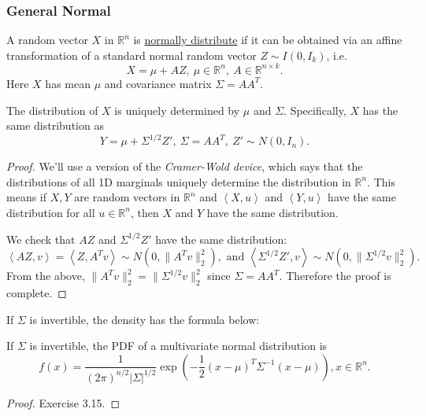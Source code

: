 \subsubsection{General Normal}
\begin{definition}[]
\label{def:3.3.4}
A random vector $X$ in $\mathbb{R}^n$ is \underline{normally distribute} if it can be obtained via an 
affine transformation of a standard normal random vector $Z \sim I(0, I_k)$, i.e.
\[ X = \mu + AZ, \ \mu \in \mathbb{R}^n, \ A \in \mathbb{R}^{n \times k}. \]
Here $X$ has mean $\mu$ and covariance matrix $\Sigma = AA^T$.
\end{definition}

\begin{proposition}
\label{prop:3.3.5}
The distribution of $X$ is uniquely determined by $\mu$ and $\Sigma$. Specifically, $X$ has the same 
distribution as 
\[ Y = \mu + \Sigma^{1/2}Z', \ \Sigma = AA^T, \ Z' \sim N(0, I_n). \]
\end{proposition}

\begin{proof}
We'll use a version of the \textit{Cramer-Wold device}, which says that the distributions of all 1D marginals 
uniquely determine the distribution in $\mathbb{R}^n$. This means if $X, Y$ are random vectors in $\mathbb{R}^n$ 
and $\left\langle X, u \right\rangle$ and $\left\langle Y, u \right\rangle$ have the same distribution for all 
$u \in \mathbb{R}^n$, then $X$ and $Y$ have the same distribution.

We check that $AZ$ and $\Sigma^{1/2} Z'$ have the same distribution: 
\[ \left\langle AZ, v \right\rangle = \left\langle Z, A^T v \right\rangle \sim N(0, 
\lVert A^T v \rVert_{2}^2), \text{ and } \left\langle \Sigma^{1/2}Z', v \right\rangle 
\sim N(0, \lVert \Sigma^{1/2} v \rVert_{2}^2). \]
From the above, $\lVert A^T v \rVert_{2}^2 = \lVert \Sigma^{1/2} v \rVert_{2}^2$ since $\Sigma = AA^T$. 
Therefore the proof is complete.
\end{proof}

If $\Sigma$ is invertible, the density has the formula below: 
\begin{proposition}[]
\label{prop:3.3.6}
If $\Sigma$ is invertible, the PDF of a multivariate normal distribution is 
\[ f(x) = \frac{1}{(2 \pi)^{n/2}|\Sigma|^{1/2}} \exp{\left( -\frac{1}{2}(x - \mu)^T \Sigma^{-1} 
(x - \mu)\right)}, x \in \mathbb{R}^n. \]
\end{proposition}

\begin{proof}
Exercise 3.15.
\end{proof}

